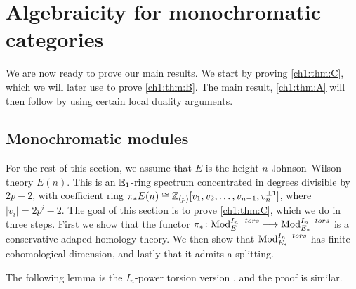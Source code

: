 
\section{Algebraicity for monochromatic categories}

We are now ready to prove our main results. We start by proving \cref{ch1:thm:C}, which we will later use to prove \cref{ch1:thm:B}. The main result, \cref{ch1:thm:A} will then follow by using certain local duality arguments. 

\subsection{Monochromatic modules}
\label{ch1:ssec:algebraicity-modules}

For the rest of this section, we assume that $E$ is the height $n$ Johnson--Wilson theory $E(n)$. This is an $\mathbb{E}_1$-ring spectrum concentrated in degrees divisible by $2p-2$, with coefficient ring $\pi_* E(n) \cong \mathbb{Z}_{(p)}[v_1, v_2, \ldots, v_{n-1}, v_n^{\pm 1}]$, where $|v_i| = 2p^i-2$. The goal of this section is to prove \cref{ch1:thm:C}, which we do in three steps. First we show that the functor $\pi_*\colon \mathrm{Mod}_{E}^{I_n-tors} \longrightarrow \mathrm{Mod}_{E_*}^{I_n-tors}$ is a conservative adaped homology theory. We then show that $\mathrm{Mod}_{E_*}^{I_n-tors}$ has finite cohomological dimension, and lastly that it admits a splitting. 

The following lemma is the $I_n$-power torsion version \cite[3.14]{barthel-frankland_15}, and the proof is similar.

